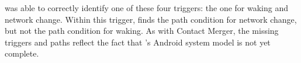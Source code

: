 \hogarth{} was able to correctly identify one of these four triggers: the 
one for waking and network change. Within this trigger, \hogarth{} finds 
the path condition for network change, but not the path condition for 
waking. As with Contact Merger, the missing triggers and paths reflect 
the fact that \hogarth{}'s Android system model is not yet complete.





%
%



%


